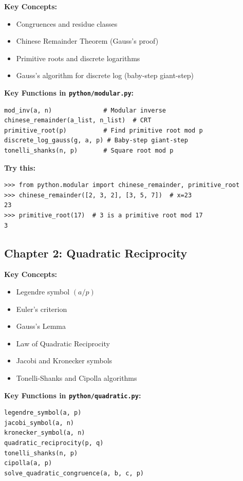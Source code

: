 \documentclass[11pt,a4paper]{article}
\begin{document}
\textbf{Key Concepts:}
\begin{itemize}
    \item Congruences and residue classes
    \item Chinese Remainder Theorem (Gauss's proof)
    \item Primitive roots and discrete logarithms
    \item Gauss's algorithm for discrete log (baby-step giant-step)
\end{itemize}

\textbf{Key Functions in \texttt{python/modular.py}:}
\begin{lstlisting}[style=python]
mod_inv(a, n)              # Modular inverse
chinese_remainder(a_list, n_list)  # CRT
primitive_root(p)          # Find primitive root mod p
discrete_log_gauss(g, a, p) # Baby-step giant-step
tonelli_shanks(n, p)       # Square root mod p
\end{lstlisting}

\textbf{Try this:}
\begin{lstlisting}[style=python]
>>> from python.modular import chinese_remainder, primitive_root
>>> chinese_remainder([2, 3, 2], [3, 5, 7])  # x=23
23
>>> primitive_root(17)  # 3 is a primitive root mod 17
3
\end{lstlisting}

\subsection{Chapter 2: Quadratic Reciprocity}

\textbf{Key Concepts:}
\begin{itemize}
    \item Legendre symbol $(a/p)$
    \item Euler's criterion
    \item Gauss's Lemma
    \item Law of Quadratic Reciprocity
    \item Jacobi and Kronecker symbols
    \item Tonelli-Shanks and Cipolla algorithms
\end{itemize}

\textbf{Key Functions in \texttt{python/quadratic.py}:}
\begin{lstlisting}[style=python]
legendre_symbol(a, p)
jacobi_symbol(a, n)
kronecker_symbol(a, n)
quadratic_reciprocity(p, q)
tonelli_shanks(n, p)
cipolla(a, p)
solve_quadratic_congruence(a, b, c, p)
\end{lstlisting}
\end{document}
